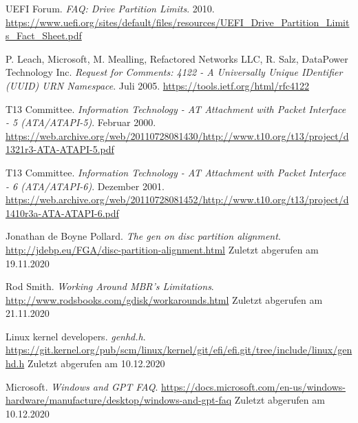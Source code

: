 \begin{thebibliography}{9}
        UEFI Forum.
        \textit{FAQ: Drive Partition Limits}.
        2010.
        \url{https://www.uefi.org/sites/default/files/resources/UEFI_Drive_Partition_Limits_Fact_Sheet.pdf}

        P. Leach, Microsoft, M. Mealling, Refactored Networks LLC, R. Salz, DataPower Technology Inc.
        \textit{Request for Comments: 4122 - A Universally Unique IDentifier (UUID) URN Namespace}.
        Juli 2005.
        \url{https://tools.ietf.org/html/rfc4122}

        T13 Committee.
        \textit{Information Technology - AT Attachment with Packet Interface - 5 (ATA/ATAPI-5)}.
        Februar 2000.
        \url{https://web.archive.org/web/20110728081430/http://www.t10.org/t13/project/d1321r3-ATA-ATAPI-5.pdf}

        T13 Committee.
        \textit{Information Technology - AT Attachment with Packet Interface - 6 (ATA/ATAPI-6)}.
        Dezember 2001.
        \url{https://web.archive.org/web/20110728081452/http://www.t10.org/t13/project/d1410r3a-ATA-ATAPI-6.pdf}

        Jonathan de Boyne Pollard.
        \textit{The gen on disc partition alignment}.
        \url{http://jdebp.eu/FGA/disc-partition-alignment.html}
        Zuletzt abgerufen am 19.11.2020

        Rod Smith.
        \textit{Working Around MBR's Limitations}.
        \url{http://www.rodsbooks.com/gdisk/workarounds.html}
        Zuletzt abgerufen am 21.11.2020

        Linux kernel developers.
        \textit{genhd.h}.
        \url{https://git.kernel.org/pub/scm/linux/kernel/git/efi/efi.git/tree/include/linux/genhd.h}
        Zuletzt abgerufen am 10.12.2020

        Microsoft.
        \textit{Windows and GPT FAQ}.
        \url{https://docs.microsoft.com/en-us/windows-hardware/manufacture/desktop/windows-and-gpt-faq}
        Zuletzt abgerufen am 10.12.2020

\end{thebibliography}
